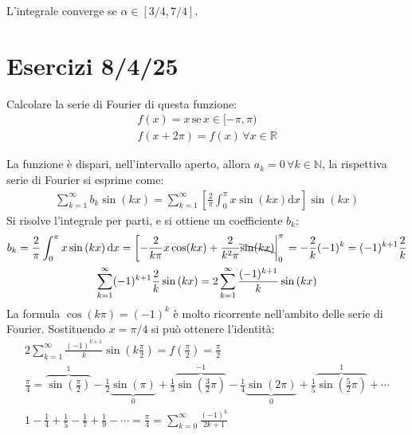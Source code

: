 \documentclass{article}
\newcommand{\df}{\mathrm{d}}
\numberwithin{equation}{subsection}
\begin{document}
L'integrale converge se $\alpha\in[3/4,7/4]$. 




\clearpage

\section{Esercizi 8/4/25}

Calcolare la serie di Fourier di questa funzione:
\begin{gather*}
    f(x)=x\,\mbox{se}\,x\in[-\pi,\pi)\\
    f(x+2\pi)=f(x)\, \forall x\in\mathbb{R}
\end{gather*}


La funzione è dispari, nell'intervallo aperto, allora $a_k=0\,\forall k\in\mathbb{N}$, la rispettiva serie di Fourier si esprime come:
\begin{gather*}
    \displaystyle\sum_{k=1}^\infty b_k\sin\left(kx\right)=
    \displaystyle\sum_{k=1}^\infty\left[\frac{2}{\pi}\int_0^{\pi}x\sin\left(kx\right)\df x\right]\sin(kx)
\end{gather*}
Si risolve l'integrale per parti, e si ottiene un coefficiente $b_k$:
\begin{gather*}
    b_k=\frac{2}{\pi}\int_0^{\pi}x\sin\left(kx\right)\df x=\left[-\frac{2}{k\pi}x\cos(kx)+\frac{2}{k^2\pi}\bcancel{\sin(kx)}\bigg|_0^\pi\right.=-\frac{2}{k}(-1)^k=(-1)^{k+1}\frac{2}{k}\\
    \displaystyle\sum_{k=1}^\infty (-1)^{k+1}\frac{2}{k}\sin\left(kx\right)=
    2\sum_{k=1}^\infty \frac{(-1)^{k+1}}{k}\sin\left(kx\right)
\end{gather*}
La formula $\cos(k\pi)=(-1)^k$ è molto ricorrente nell'ambito delle serie di Fourier. Sostituendo $x=\pi/4$ si può ottenere l'identità:
\begin{gather*}
    2\sum_{k=1}^\infty \frac{(-1)^{k+1}}{k}\sin\left(k\frac{\pi}{2}\right)=f\left(\frac{\pi}{2}\right)=\frac{\pi}{2}\\
    \displaystyle\frac{\pi}{4}=\overbrace{\sin\left(\frac{\pi}{2}\right)}^1-\frac{1}{2}\underbrace{\sin(\pi)}_{0}+\frac{1}{3}\overbrace{\sin\left(\frac{3}{2}\pi\right)}^{-1}-\frac{1}{4}\underbrace{\sin(2\pi)}_0+\frac{1}{5}\overbrace{\sin\left(\frac{5}{2}\pi\right)}^1+\cdots\\
    \displaystyle1-\frac{1}{4}+\frac{1}{5}-\frac{1}{7}+\frac{1}{9}-\cdots=\frac{\pi}{4}=\displaystyle\sum_{k=0}^\infty\frac{(-1)^k}{2k+1}
\end{gather*}
\end{document}
